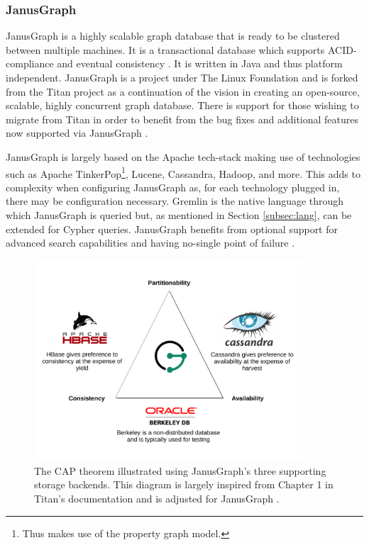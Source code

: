 \subsubsection{JanusGraph}

JanusGraph is a highly scalable graph database that is ready to be clustered between multiple machines. It is a transactional database which supports ACID-compliance and eventual consistency \cite{janusgraph-main}. It is written in Java and thus platform independent. JanusGraph is a project under The Linux Foundation and is forked from the Titan project as a continuation of the vision in creating an open-source, scalable, highly concurrent graph database. There is support for those wishing to migrate from Titan in order to benefit from the bug fixes and additional features now supported via JanusGraph \cite{janusgraph-titan}.

JanusGraph is largely based on the Apache tech-stack making use of technologies such as Apache TinkerPop\footnote{Thus makes use of the property graph model.}, Lucene, Cassandra, Hadoop, and more. This adds to complexity when configuring JanusGraph as, for each technology plugged in, there may be configuration necessary. Gremlin is the native language through which JanusGraph is queried but, as mentioned in Section \ref{subsec:lang}, can be extended for Cypher queries. JanusGraph benefits from optional support for advanced search capabilities and having no-single point of failure \cite{janusgraph-docs}.

\begin{figure}[h]
    \centering
    \includegraphics[width=10cm]{img/CAP.pdf}
    \caption{The CAP theorem illustrated using JanusGraph's three supporting storage backends. This diagram is largely inspired from Chapter 1 in Titan's documentation and is adjusted for JanusGraph \cite{titan-cap}.}
    \label{fig:janusgraph-cap}
\end{figure}

